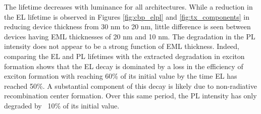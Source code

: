 \documentclass[../thesis.tex]{subfiles}
\begin{document}
The lifetime decreases with luminance for all architectures.  
While a reduction in the EL lifetime is observed in Figures \ref{fig:cbp_elpl} and \ref{fig:tx_components} in reducing device thickness from 30 nm to 20 nm, little difference is seen between devices having EML thicknesses of 20 nm and 10 nm.  
The degradation in the PL intensity does not appear to be a strong function of EML thickness.  
Indeed, comparing the EL and PL lifetimes with the extracted degradation in exciton formation shows that the EL decay is dominated by a loss in the efficiency of exciton formation with \ef reaching 60\% of its initial value by the time EL has reached 50\%.  
A substantial component of this decay is likely due to non-radiative recombination center formation.\supercite{Kondakov2003,Kondakov2007d}
Over this same period, the PL intensity has only degraded by ~10\% of its initial value.
\end{document}
